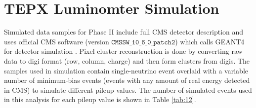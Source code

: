 


\section{TEPX Luminomter Simulation}

 Simulated data samples for Phase II include full CMS detector description and uses official CMS software (version $\texttt{CMSSW\_10\_6\_0\_patch2}$) which calls GEANT4 for detector simulation \cite{GEANT4:2002zbu}. Pixel cluster reconstruction is done by converting raw data to digi format (row, column, charge) and then form clusters from digis. The samples used in simulation contain single-neutrino event overlaid with a variable number of minimum-bias events (events with any amount of real energy detected in CMS) to simulate different pileup values.  The number of simulated events used in this analysis for each pileup value is shown in Table \ref{tab:12}.
 
